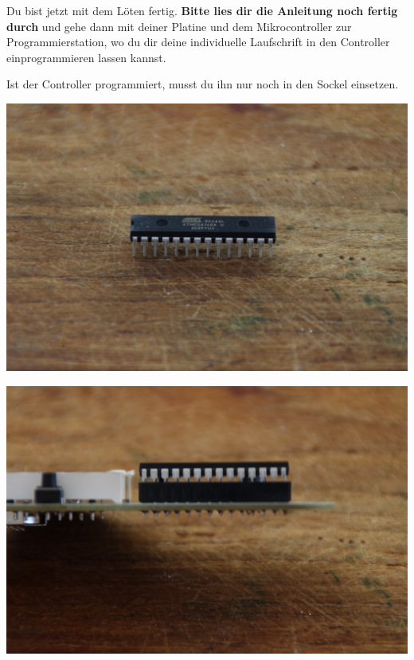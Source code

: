 \documentclass{article}
\begin{document}
Du bist jetzt mit dem Löten fertig. \textbf{Bitte lies dir die Anleitung noch fertig durch} und gehe dann mit deiner Platine und dem Mikrocontroller zur Programmierstation, wo du dir deine individuelle Laufschrift in den Controller einprogrammieren lassen kannst.

Ist der Controller programmiert, musst du ihn nur noch in den Sockel einsetzen.

\vspace{1cm}

\begin{minipage}[b]{0.5\textwidth}
	\includegraphics[width=\textwidth]{Bilder2023/IMG_8392.JPG}
\end{minipage}
\begin{minipage}[b]{0.5\textwidth}
	\includegraphics[width=\textwidth]{Bilder2023/IMG_8393.JPG}
\end{minipage}
\end{document}
